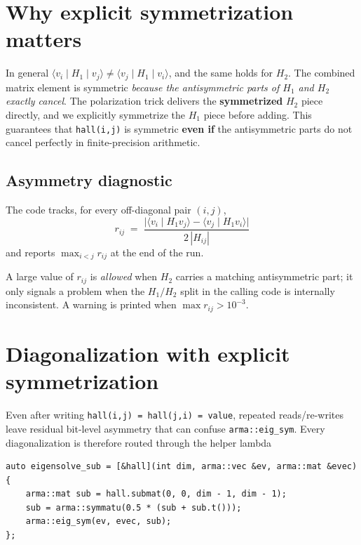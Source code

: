 \documentclass[11pt]{article}
\begin{document}
\section{Why explicit symmetrization matters}

In general $\langle v_i \mid H_1 \mid v_j \rangle \neq
\langle v_j \mid H_1 \mid v_i \rangle$, and the same holds for $H_2$.
The combined matrix element is symmetric \emph{because the antisymmetric
parts of $H_1$ and $H_2$ exactly cancel}.  The polarization trick
delivers the \textbf{symmetrized} $H_2$ piece directly, and we
explicitly symmetrize the $H_1$ piece before adding.  This guarantees
that \texttt{hall(i,j)} is symmetric \textbf{even if} the antisymmetric
parts do not cancel perfectly in finite-precision arithmetic.

\subsection*{Asymmetry diagnostic}

The code tracks, for every off-diagonal pair $(i, j)$,
\begin{equation}
  r_{ij}
  \;=\;
  \frac{
    \bigl|\langle v_i \mid H_1 v_j \rangle
         - \langle v_j \mid H_1 v_i \rangle\bigr|
  }{
    2\,|H_{ij}|
  }
\end{equation}
and reports $\max_{i < j} r_{ij}$ at the end of the run.

A large value of $r_{ij}$ is \emph{allowed} when $H_2$ carries a
matching antisymmetric part; it only signals a problem when the
$H_1/H_2$ split in the calling code is internally inconsistent.
A warning is printed when $\max r_{ij} > 10^{-3}$.

\section{Diagonalization with explicit symmetrization}

Even after writing \texttt{hall(i,j) = hall(j,i) = value}, repeated
reads/re-writes leave residual bit-level asymmetry that can confuse
\texttt{arma::eig\_sym}.  Every diagonalization is therefore routed
through the helper lambda

\begin{lstlisting}
auto eigensolve_sub = [&hall](int dim, arma::vec &ev, arma::mat &evec)
{
    arma::mat sub = hall.submat(0, 0, dim - 1, dim - 1);
    sub = arma::symmatu(0.5 * (sub + sub.t()));
    arma::eig_sym(ev, evec, sub);
};
\end{lstlisting}
\end{document}
